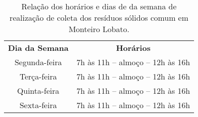 \begin{center}
\begin{table}[htbp]
	\centering
	\caption{Relação dos horários e dias de da semana de realização de coleta dos resíduos sólidos comum em Monteiro Lobato.}
	\begin{tabular}{c|c}
		\rowcolor[rgb]{ .969,  .588,  .275} \textcolor[rgb]{ 1,  1,  1}{\textbf{Dia da Semana}} & \textcolor[rgb]{ 1,  1,  1}{\textbf{Horários}} \\
		\rowcolor[rgb]{ .984,  .831,  .706} Segunda-feira & 7h às 11h – almoço – 12h às 16h \\
		\rowcolor[rgb]{ .992,  .914,  .851} Terça-feira & 7h às 11h – almoço – 12h às 16h \\
		\rowcolor[rgb]{ .984,  .831,  .706} Quinta-feira & 7h às 11h – almoço – 12h às 16h \\
		\rowcolor[rgb]{ .992,  .914,  .851} Sexta-feira & 7h às 11h – almoço – 12h às 16h \\
	\end{tabular}%
	\label{tab:coleta_municipal}%
\end{table}%

\end{center}